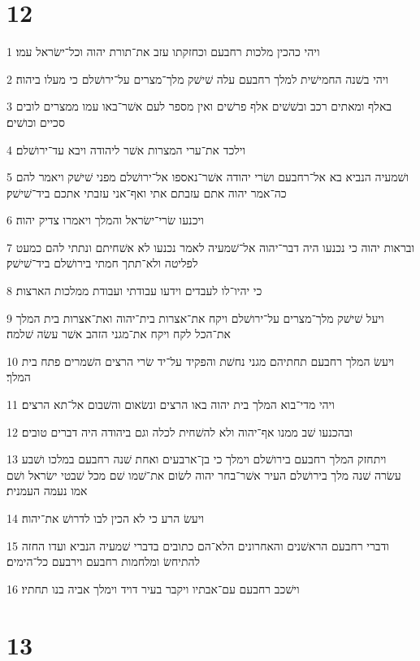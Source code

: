 \chapter{12}

\par 1 ויהי כהכין מלכות רחבעם וכחזקתו עזב את־תורת יהוה וכל־ישׂראל עמו׃
\par 2 ויהי בשׁנה החמישׁית למלך רחבעם עלה שׁישׁק מלך־מצרים על־ירושׁלם כי מעלו ביהוה׃
\par 3 באלף ומאתים רכב ובשׁשׁים אלף פרשׁים ואין מספר לעם אשׁר־באו עמו ממצרים לובים סכיים וכושׁים׃
\par 4 וילכד את־ערי המצרות אשׁר ליהודה ויבא עד־ירושׁלם׃
\par 5 ושׁמעיה הנביא בא אל־רחבעם ושׂרי יהודה אשׁר־נאספו אל־ירושׁלם מפני שׁישׁק ויאמר להם כה־אמר יהוה אתם עזבתם אתי ואף־אני עזבתי אתכם ביד־שׁישׁק׃
\par 6 ויכנעו שׂרי־ישׂראל והמלך ויאמרו צדיק יהוה׃
\par 7 ובראות יהוה כי נכנעו היה דבר־יהוה אל־שׁמעיה לאמר נכנעו לא אשׁחיתם ונתתי להם כמעט לפליטה ולא־תתך חמתי בירושׁלם ביד־שׁישׁק׃
\par 8 כי יהיו־לו לעבדים וידעו עבודתי ועבודת ממלכות הארצות׃
\par 9 ויעל שׁישׁק מלך־מצרים על־ירושׁלם ויקח את־אצרות בית־יהוה ואת־אצרות בית המלך את־הכל לקח ויקח את־מגני הזהב אשׁר עשׂה שׁלמה׃
\par 10 ויעשׂ המלך רחבעם תחתיהם מגני נחשׁת והפקיד על־יד שׂרי הרצים השׁמרים פתח בית המלך׃
\par 11 ויהי מדי־בוא המלך בית יהוה באו הרצים ונשׂאום והשׁבום אל־תא הרצים׃
\par 12 ובהכנעו שׁב ממנו אף־יהוה ולא להשׁחית לכלה וגם ביהודה היה דברים טובים׃
\par 13 ויתחזק המלך רחבעם בירושׁלם וימלך כי בן־ארבעים ואחת שׁנה רחבעם במלכו ושׁבע עשׂרה שׁנה מלך בירושׁלם העיר אשׁר־בחר יהוה לשׂום את־שׁמו שׁם מכל שׁבטי ישׂראל ושׁם אמו נעמה העמנית׃
\par 14 ויעשׂ הרע כי לא הכין לבו לדרושׁ את־יהוה׃
\par 15 ודברי רחבעם הראשׁנים והאחרונים הלא־הם כתובים בדברי שׁמעיה הנביא ועדו החזה להתיחשׂ ומלחמות רחבעם וירבעם כל־הימים׃
\par 16 וישׁכב רחבעם עם־אבתיו ויקבר בעיר דויד וימלך אביה בנו תחתיו׃

\chapter{13}

